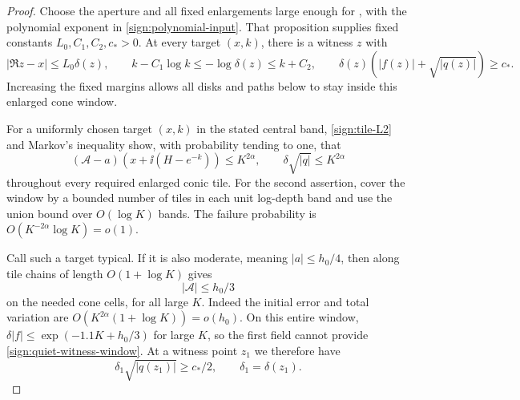 \begin{proof}
Choose the aperture and all fixed enlargements large enough for
, with the polynomial exponent in
\eqref{sign:polynomial-input}.  That proposition supplies fixed
constants \(L_0,C_1,C_2,c_*>0\).  At every target \((x,k)\), there
is a witness \(z\) with
\begin{equation}\label{sign:quiet-witness-window}
 |\Re z-x|\le L_0\delta(z),\qquad
 k-C_1\log k\le-\log\delta(z)\le k+C_2,
 \qquad \delta(z)(|f(z)|+\sqrt{|q(z)|})\ge c_*.
\end{equation}
Increasing the fixed margins allows all disks and paths below to stay
inside this enlarged cone window.

For a uniformly chosen target \((x,k)\) in the stated central band,
\eqref{sign:tile-L2} and Markov's inequality show, with probability
tending to one, that
\begin{equation}\label{sign:typical-target}
 (\mathcal A-a)(x+\ii(H-e^{-k}))\le K^{2\alpha},
 \qquad \delta\sqrt{|q|}\le K^{2\alpha}
\end{equation}
throughout every required enlarged conic tile.  For the second
assertion, cover the window by a bounded number of tiles in each unit
log-depth band and use the union bound over \(O(\log K)\) bands.
The failure probability is \(O(K^{-2\alpha}\log K)=o(1)\).

Call such a target typical.  If it is also moderate, meaning
\(|a|\le h_0/4\), then  along tile chains of
length \(O(1+\log K)\) gives
\begin{equation}\label{sign:cone-amplitude}
 |\mathcal A|\le h_0/3
\end{equation}
on the needed cone cells, for all large \(K\).  Indeed the initial
error and total variation are
\(O(K^{2\alpha}(1+\log K))=o(h_0)\).  On this entire window,
\(\delta|f|\le\exp(-1.1K+h_0/3)\) for large \(K\), so the
first field cannot provide \eqref{sign:quiet-witness-window}.
At a witness point \(z_1\) we therefore have
\begin{equation}\label{sign:q-witness}
 \delta_1\sqrt{|q(z_1)|}\ge c_*/2,
       \qquad \delta_1=\delta(z_1).
\end{equation}


\end{proof}
